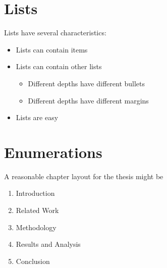 \section{Lists}

Lists have several characteristics:

\begin{itemize}
\item Lists can contain items
\item Lists can contain other lists
\begin{itemize}
\item Different depths have different bullets
\item Different depths have different margins
\end{itemize}
\item Lists are easy
\end{itemize}

\section{Enumerations}

A reasonable chapter layout for the thesis might be

\begin{enumerate}
\item Introduction
\item Related Work
\item Methodology
\item Results and Analysis
\item Conclusion
\end{enumerate}

